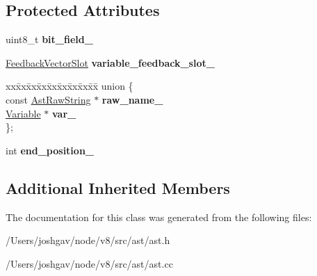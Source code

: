 \subsection*{Protected Attributes}
\begin{DoxyCompactItemize}
\item 
uint8\+\_\+t {\bfseries bit\+\_\+field\+\_\+}\hypertarget{classv8_1_1internal_1_1_variable_proxy_a0ffe26e9a70cea0c7297684182bc9248}{}\label{classv8_1_1internal_1_1_variable_proxy_a0ffe26e9a70cea0c7297684182bc9248}

\item 
\hyperlink{classv8_1_1internal_1_1_feedback_vector_slot}{Feedback\+Vector\+Slot} {\bfseries variable\+\_\+feedback\+\_\+slot\+\_\+}\hypertarget{classv8_1_1internal_1_1_variable_proxy_a644fa5112f0459d6d89f146353671f98}{}\label{classv8_1_1internal_1_1_variable_proxy_a644fa5112f0459d6d89f146353671f98}

\item 
\begin{tabbing}
xx\=xx\=xx\=xx\=xx\=xx\=xx\=xx\=xx\=\kill
union \{\\
\>const \hyperlink{classv8_1_1internal_1_1_ast_raw_string}{AstRawString} $\ast$ {\bfseries raw\_name\_}\\
\>\hyperlink{classv8_1_1internal_1_1_variable}{Variable} $\ast$ {\bfseries var\_}\\
\}; \hypertarget{classv8_1_1internal_1_1_variable_proxy_a65a858f7a6f6fe1e534a9e1e2ce9aa1f}{}\label{classv8_1_1internal_1_1_variable_proxy_a65a858f7a6f6fe1e534a9e1e2ce9aa1f}
\\

\end{tabbing}\item 
int {\bfseries end\+\_\+position\+\_\+}\hypertarget{classv8_1_1internal_1_1_variable_proxy_a031f5e4b1d098dc5d8aa03c0485157ac}{}\label{classv8_1_1internal_1_1_variable_proxy_a031f5e4b1d098dc5d8aa03c0485157ac}

\end{DoxyCompactItemize}
\subsection*{Additional Inherited Members}


The documentation for this class was generated from the following files\+:\begin{DoxyCompactItemize}
\item 
/\+Users/joshgav/node/v8/src/ast/ast.\+h\item 
/\+Users/joshgav/node/v8/src/ast/ast.\+cc\end{DoxyCompactItemize}
